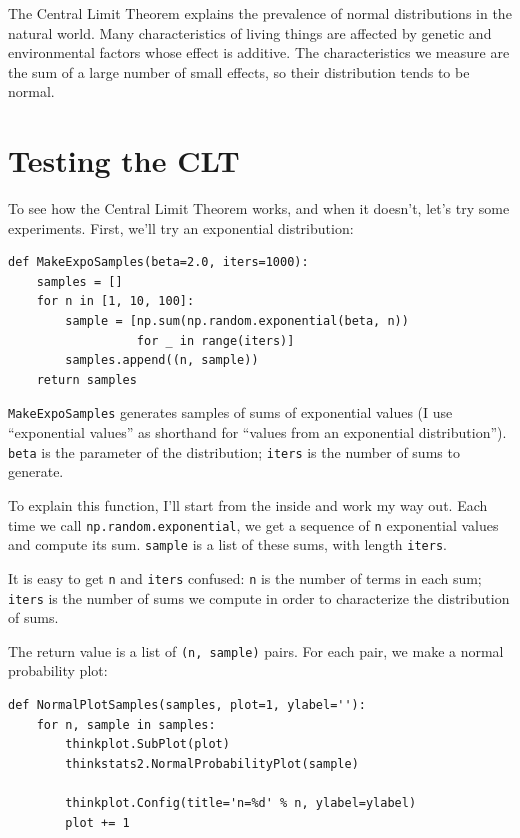 \documentclass[12pt]{book}
\begin{document}
The Central Limit Theorem explains the prevalence
of normal distributions in the natural world.  Many characteristics of
living things are affected by genetic
and environmental factors whose effect is additive.  The characteristics
we measure are the sum of a large number of small effects, so their
distribution tends to be normal.


\section{Testing the CLT}

To see how the Central Limit Theorem works, and when it doesn't,
let's try some experiments.  First, we'll try
an exponential distribution:

\begin{verbatim}
def MakeExpoSamples(beta=2.0, iters=1000):
    samples = []
    for n in [1, 10, 100]:
        sample = [np.sum(np.random.exponential(beta, n))
                  for _ in range(iters)]
        samples.append((n, sample))
    return samples
\end{verbatim}

{\tt MakeExpoSamples} generates samples of sums of exponential values
(I use ``exponential values'' as shorthand for ``values from an
exponential distribution'').
{\tt beta} is the parameter of the distribution; {\tt iters}
is the number of sums to generate.

To explain this function, I'll start from the inside and work my way
out.  Each time we call {\tt np.random.exponential}, we get a sequence
of {\tt n} exponential values and compute its sum.  {\tt sample}
is a list of these sums, with length {\tt iters}.

It is easy to get {\tt n} and {\tt iters} confused:  {\tt n} is the
number of terms in each sum;  {\tt iters} is the number of sums we
compute in order to characterize the distribution of sums.

The return value is a list of {\tt (n, sample)} pairs.  For
each pair, we make a normal probability plot:

\begin{verbatim}
def NormalPlotSamples(samples, plot=1, ylabel=''):
    for n, sample in samples:
        thinkplot.SubPlot(plot)
        thinkstats2.NormalProbabilityPlot(sample)

        thinkplot.Config(title='n=%d' % n, ylabel=ylabel)
        plot += 1
\end{verbatim}
\end{document}
